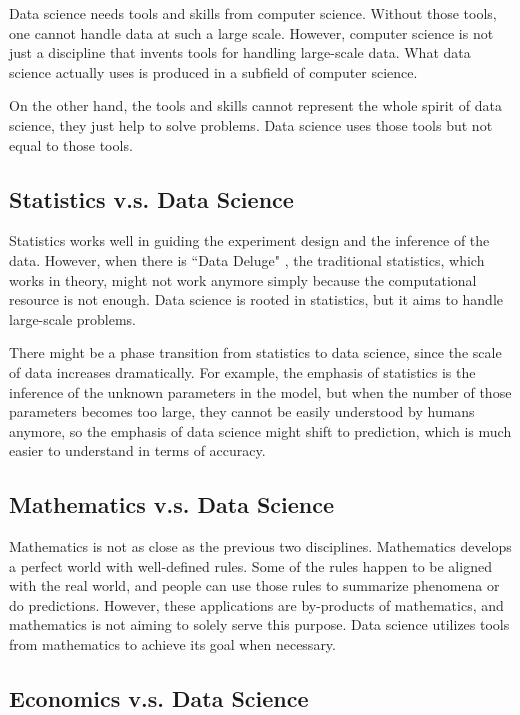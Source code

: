 Data science needs tools and skills from computer science.
Without those tools, one cannot handle data at such a large scale.
However, computer science is not just a discipline that invents tools for handling large-scale data.
What data science actually uses is produced in a subfield of computer science.

On the other hand, the tools and skills cannot represent the whole spirit of data science, they just help to solve problems.
Data science uses those tools but not equal to those tools.

\subsection*{Statistics v.s. Data Science}

Statistics works well in guiding the experiment design and the inference of the data.
However, when there is ``Data Deluge" \cite{hey_data_2003}, the traditional statistics, which works in theory, might not work anymore simply because the computational resource is not enough.
Data science is rooted in statistics, but it aims to handle large-scale problems. 

There might be a phase transition from statistics to data science, since the scale of data increases dramatically.
For example, the emphasis of statistics is the inference of the unknown parameters in the model, but when the number of those parameters becomes too large, they cannot be easily understood by humans anymore, so the emphasis of data science might shift to prediction, which is much easier to understand in terms of accuracy.

\subsection*{Mathematics v.s. Data Science}

Mathematics is not as close as the previous two disciplines.
Mathematics develops a perfect world with well-defined rules.
Some of the rules happen to be aligned with the real world, and people can use those rules to summarize phenomena or do predictions.
However, these applications are by-products of mathematics, and mathematics is not aiming to solely serve this purpose. 
Data science utilizes tools from mathematics to achieve its goal when necessary.

\subsection*{Economics v.s. Data Science}

